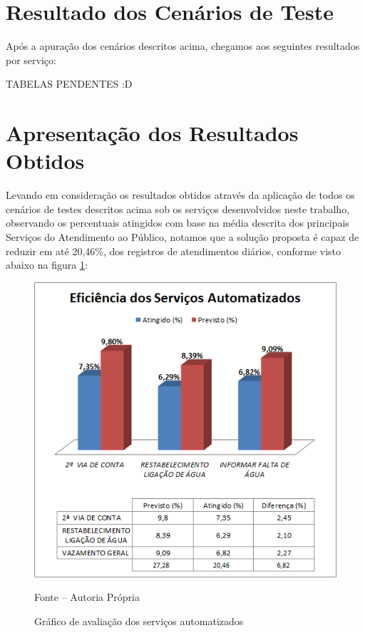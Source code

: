 \section{Resultado dos Cenários de Teste}

Após a apuração dos cenários descritos acima, chegamos aos seguintes resultados por serviço:

\begin{center}
	TABELAS PENDENTES :D		
\end{center}


\section{Apresentação dos Resultados Obtidos}

Levando em consideração os resultados obtidos através da aplicação de todos os cenários de testes descritos acima sob os serviços desenvolvidos neste trabalho, observando os percentuais atingidos com base na média descrita dos principais Serviços do Atendimento ao Público, notamos que a solução proposta é capaz de reduzir em até 20,46\%, dos registros de atendimentos diários, conforme visto abaixo na figura \ref{figura:eficienciaServicos}:	


\begin{figure}[!htb]
	\centering
	\includegraphics{figuras/eficiencia_servicos.png}
	\caption{Gráfico de avaliação dos serviços automatizados}
	\label{figura:eficienciaServicos}	
	Fonte – Autoria Própria
\end{figure}

